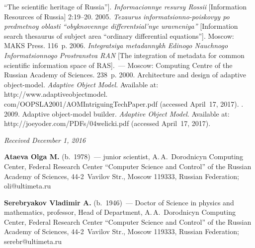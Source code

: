 \begin{multicols}{2}
{{\begin{thebibliography}{99}
``The scientific heritage of Russia''].
\textit{Informacionnye resursy Rossii} [Information Resources of Russia] 
2:19--20.
 2005. 
\textit{Tezaurus informatsionno-poiskovyy po predmetnoy oblasti 
``obyknovennye differentsial'nye uravneniya''} [Information search thesaurus of 
subject area ``ordinary differential equations'']. Moscow: MAKS Press. 116~p.
 2006. \textit{Integratsiya metadannykh Edinogo Nauchnogo 
Informatsionnogo Prostranstva RAN} [The integration of metadata for common 
scientific information space of RAS].~--- Moscow: Computing Centre of the 
Russian Academy of Sciences. 238~p.
 2000. Architecture and 
design of adaptive object-model. \textit{Adaptive Object Model.} 
Available at: {\sf http://www.adaptiveobjectmodel. com/OOPSLA2001/AOMIntriguingTechPaper.pdf} (accessed 
April~17, 2017).
. 2009. Adaptive  
object-model builder. \textit{Adaptive Object Model}. Available at: {\sf 
http://joeyoder.com/PDFs/04welicki.pdf} (accessed April~17, 2017). 
\end{thebibliography}

 }
 }

\end{multicols}

\vspace*{-3pt}

\hfill{\small\textit{Received December 1, 2016}}

\Contr

\noindent
\textbf{Ataeva Olga M.} (b.\ 1978)~--- junior scientist, A.\,A.~Dorodnicyn 
Computing Center, Federal Research Center ``Computer Science and Control'' 
of the Russian Academy of Sciences, 44-2~Vavilov Str., Moscow 119333, 
Russian Federation; \mbox{oli@ultimeta.ru}

\vspace*{3pt}

\noindent
\textbf{Serebryakov Vladimir A.} (b.\ 1946)~--- Doctor of Science in physics 
and mathematics, professor, Head of Department, A.\,A.~Dorodnicyn Computing 
Center, Federal Research Center ``Computer Science and Control'' 
of the Russian Academy of Sciences, 44-2~Vavilov Str., Moscow 119333, 
Russian Federation; \mbox{serebr@ultimeta.ru}
\label{end\stat}


\renewcommand{\bibname}{\protect\rm Литература} 